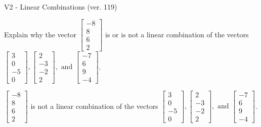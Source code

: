 \begin{exercise}
  \begin{exerciseTitle}V2 - Linear Combinations (ver. 119)\end{exerciseTitle}
  \begin{exerciseStatement}
    Explain why the vector \(\left[\begin{array}{c}
-8 \\
8 \\
6 \\
2
\end{array}\right]\)  is or is not a linear 
	combination of the vectors \(\left[\begin{array}{c}
3 \\
0 \\
-5 \\
0
\end{array}\right] , \left[\begin{array}{c}
2 \\
-3 \\
-2 \\
2
\end{array}\right] , \text{ and } \left[\begin{array}{c}
-7 \\
6 \\
9 \\
-4
\end{array}\right]\).
	


  \end{exerciseStatement}
  \begin{exerciseAnswer}
   \(\left[\begin{array}{c}
-8 \\
8 \\
6 \\
2
\end{array}\right]\) 
  	 is not  
	a linear combination of the vectors \(\left[\begin{array}{c}
3 \\
0 \\
-5 \\
0
\end{array}\right] , \left[\begin{array}{c}
2 \\
-3 \\
-2 \\
2
\end{array}\right] , \text{ and } \left[\begin{array}{c}
-7 \\
6 \\
9 \\
-4
\end{array}\right]\).

	
  


  \end{exerciseAnswer}
\end{exercise}